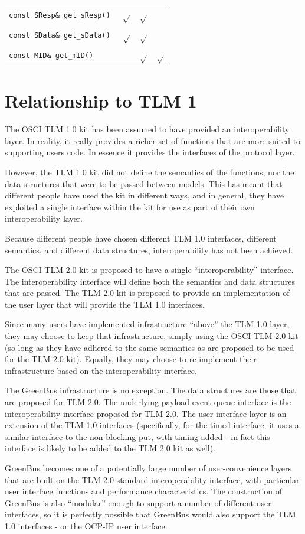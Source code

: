 \documentclass[12pt,oneside]{gsbook}
\newcommand{\tick}{$\sqrt{}$}
\begin{document}
\begin{tabular}{|p{8cm}|c|c|c|}
 {\tt const SResp\& get\_sResp()  }		&\tick&\tick&\\
 {\tt const SData\& get\_sData()  }		&\tick&\tick&\\

 {\tt const MID\& get\_mID()}			&	&\tick&\tick\\

\hline
\end{tabular}


\appendix
\chapter{Relationship to TLM 1}

The OSCI TLM 1.0 kit has been assumed to have provided an
interoperability layer. In reality, it really provides a richer set of
functions that are more suited to supporting users code. In essence it
provides the interfaces of the protocol layer.

However, the TLM 1.0 kit did not define the semantics of the
functions, nor the data structures that were to be passed between
models. This has meant that different people have used the kit in
different ways, and in general, they have exploited a single interface
within the kit for use as part of their own interoperability layer.

Because different people have chosen different TLM 1.0 interfaces, 
different semantics, and different data structures, interoperability
has not been achieved.

The OSCI TLM 2.0 kit is proposed to have a single ``interoperability''
interface. The interoperability interface will define both
the semantics and data structures that are passed. The TLM 2.0 kit is
proposed to provide an implementation of the user layer that will
provide the TLM 1.0 interfaces.

Since many users have implemented infrastructure ``above'' the TLM 1.0
layer, they may choose to keep that infrastructure, simply using the
OSCI TLM 2.0 kit (so long as they have adhered to the same semantics
as are proposed to be used for the TLM 2.0 kit). Equally, they may
choose to re-implement their infrastructure based on the
interoperability interface.

The GreenBus infrastructure is no exception. The data structures are
those that are proposed for TLM 2.0. The underlying payload event
queue interface is the interoperability interface proposed for TLM
2.0. The user interface layer is an extension of the TLM 1.0
interfaces (specifically, for the timed interface, it uses a similar interface to the
non-blocking put, with timing added - in fact this interface is likely
to be added to the TLM 2.0 kit as well). 

GreenBus becomes one of a potentially large number of user-convenience
layers that are built on the TLM 2.0 standard interoperability
interface, with particular user interface functions and performance
characteristics. The construction of GreenBus is also ``modular''
enough to support a number of different user interfaces, so it is
perfectly possible that GreenBus would also support the TLM 1.0
interfaces - or the OCP-IP user interface.
\end{document}
